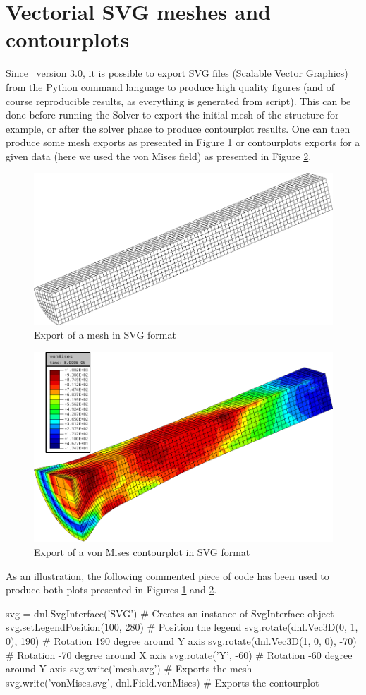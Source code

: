\section{Vectorial SVG meshes and contourplots}
Since \DynELA~version 3.0, it is possible to export SVG files (Scalable Vector Graphics) from the Python command language to produce high quality figures (and of course reproducible results, as everything is generated from script). This can be done before running the Solver to export the initial mesh of the structure for example, or after the solver phase to produce contourplot results. One can then produce some mesh exports as presented in Figure \ref{fig:PL!SVG!Mesh} or contourplots exports for a given data (here we used the von Mises field) as presented in Figure \ref{fig:PL!SVG!Contourplot}.
\begin{figure}[h]
\begin{centering}
\includegraphics[width=0.5\columnwidth]{Figures/ProgrammingLanguage/mesh}
\par\end{centering}
\caption{Export of a mesh in SVG format\label{fig:PL!SVG!Mesh}}
\end{figure}

\begin{figure}[h]
\begin{centering}
\includegraphics[width=0.5\columnwidth]{Figures/ProgrammingLanguage/vonMisesCP}
\par\end{centering}
\caption{Export of a von Mises contourplot in SVG format\label{fig:PL!SVG!Contourplot}}
\end{figure}

As an illustration, the following commented piece of code has been used to produce both plots presented in Figures \ref{fig:PL!SVG!Mesh} and \ref{fig:PL!SVG!Contourplot}.
\begin{PythonListing}
svg = dnl.SvgInterface('SVG')       # Creates an instance of SvgInterface object
svg.setLegendPosition(100, 280)     # Position the legend
svg.rotate(dnl.Vec3D(0, 1, 0), 190) # Rotation 190 degree around Y axis
svg.rotate(dnl.Vec3D(1, 0, 0), -70) # Rotation -70 degree around X axis
svg.rotate('Y', -60)                # Rotation -60 degree around Y axis
svg.write('mesh.svg')               # Exports the mesh
svg.write('vonMises.svg', dnl.Field.vonMises) # Exports the contourplot
\end{PythonListing}

